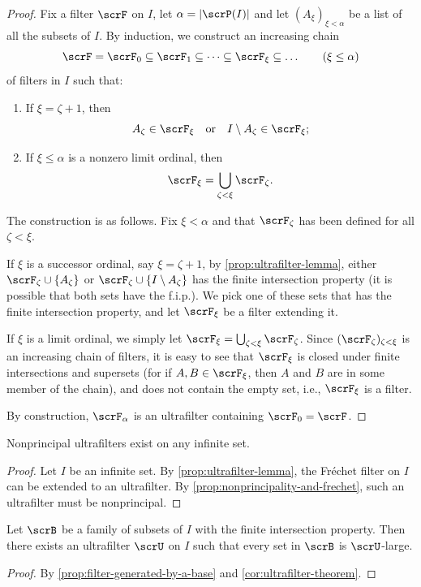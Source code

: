 \begin{proof}
  Fix a filter $\scrF$ on $I$,  let $\alpha=|\scrP(I)|$ and let $(A_\xi)_{\xi<\alpha}$ be a list of all the subsets of $I$.
  By induction, we construct an increasing chain
  \[
    \scrF=\scrF_0\subseteq \scrF_1\subseteq \dots\subseteq \scrF_\xi\subseteq \dots\qquad (\xi\le\alpha)
  \]
  of filters in $I$  such that:
  \begin{enumerate}
  \item
    If $\xi = \zeta +1$, then
    \[
      A_\zeta\in \scrF_\xi
      \quad\text{or}\quad
      I\setminus A_\zeta\in \scrF_\xi;
    \]
  \item
    If $\xi\le\alpha$ is a nonzero limit ordinal, then
    \[
      \scrF_\xi = \bigcup_{\zeta <\xi} \scrF_\zeta\text{.}
    \]
  \end{enumerate}

  The construction is as follows.
  Fix $\xi<\alpha$ and that $\scrF_\zeta$ has been defined for all $\zeta<\xi$.

  If $\xi$ is a successor ordinal, say $\xi=\zeta+1$, by \cref{prop:ultrafilter-lemma},
  either $\scrF_\zeta \cup \{A_\zeta\}$ or $\scrF_\zeta \cup \{I\setminus A_\zeta\}$ has the finite intersection property (it is possible that both sets have the f.i.p.).
  We pick one of these sets that has the finite intersection property, and let $\scrF_\xi$ be a filter extending it.

  If $\xi$ is a limit ordinal, we simply let $\scrF_\xi = \bigcup_{\zeta<\xi}\scrF_\zeta$.
  Since $(\scrF_\zeta)_{\zeta<\xi}$ is an increasing chain of filters, it is easy to see that
  $\scrF_\xi$ is closed under finite intersections and supersets (for if $A,B\in \scrF_\xi$, then $A$ and $B$ are in some member of the chain), and does not contain the empty set, i.e., $\scrF_\xi$ is a filter.

  By construction, $\scrF_\alpha$ is an ultrafilter containing $\scrF_0=\scrF$.

\end{proof}

\begin{corollary}
  \label{cor:nonprincipal-ultrafilters-exist}
  Nonprincipal ultrafilters exist on any infinite set.
\end{corollary}

\begin{proof}
  Let $I$ be an infinite set.
  By \cref{prop:ultrafilter-lemma}, the Fréchet filter on $I$ can be extended to an ultrafilter.
  By \cref{prop:nonprincipality-and-frechet}, such an ultrafilter must be nonprincipal.
\end{proof}

\begin{corollary}
  \label{cor:base-extended-to-ultrafilter}
  Let $\scrB$ be a family of subsets of $I$ with the finite intersection property.
  Then there exists an ultrafilter $\scrU$ on $I$ such that every set in $\scrB$ is $\scrU$-large.
\end{corollary}

\begin{proof}
  By \cref{prop:filter-generated-by-a-base} and \cref{cor:ultrafilter-theorem}.
\end{proof}

